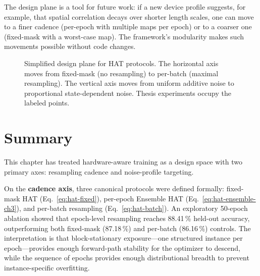 The design plane is a tool for future work: if a new device profile suggests, for example, that spatial correlation decays over shorter length scales, one can move to a finer cadence (per-epoch with multiple maps per epoch) or to a coarser one (fixed-mask with a worst-case map). The framework's modularity makes such movements possible without code changes.

\begin{figure}[t]
    \centering
    \caption{Simplified design plane for HAT protocols. The horizontal axis moves from fixed-mask (no resampling) to per-batch (maximal resampling). The vertical axis moves from uniform additive noise to proportional state-dependent noise. Thesis experiments occupy the labeled points.}
    \label{fig:design-plane}
\end{figure}

\section{Summary}
\label{sec:summary}

This chapter has treated hardware-aware training as a design space with two primary axes: resampling cadence and noise-profile targeting.

On the \textbf{cadence axis}, three canonical protocols were defined formally: fixed-mask HAT (Eq.~\ref{eq:hat-fixed}), per-epoch Ensemble HAT (Eq.~\ref{eq:hat-ensemble-ch3}), and per-batch resampling (Eq.~\ref{eq:hat-batch}). An exploratory 50-epoch ablation showed that epoch-level resampling reaches 88.41\,\% held-out accuracy, outperforming both fixed-mask (87.18\,\%) and per-batch (86.16\,\%) controls. The interpretation is that block-stationary exposure---one structured instance per epoch---provides enough forward-path stability for the optimizer to descend, while the sequence of epochs provides enough distributional breadth to prevent instance-specific overfitting.

